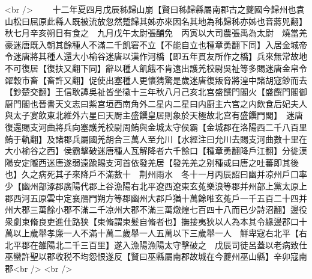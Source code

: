 <br />
　　十二年夏四月戊辰秭歸山崩【賢曰秭歸縣屬南郡古之夔國今歸州也袁山松曰屈原此縣人既被流放忽然蹔歸其姊亦來因名其地為秭歸秭亦姊也音蔣兕翻】　秋七月辛亥朔日有食之　九月戊午太尉張酺免　丙寅以大司農張禹為太尉　燒當羌豪迷唐既入朝其餘種人不滿二千飢窘不立【不能自立也種章勇翻下同】入居金城帝令迷唐將其種人還大小榆谷迷唐以漢作河橋【即五年貫友所作之橋】兵來無常故地不可復居【復扶又翻下同】辭以種人飢餓不肯遠出護羌校尉吳祉等多賜迷唐金帛令糴穀市畜【畜許又翻】促使出塞種人更懷猜驚是歲迷唐復叛脅將湟中諸胡寇鈔而去【鈔楚交翻】王信耿譚吳祉皆坐徵十三年秋八月己亥北宫盛饌門閣火【盛饌門閣御㕑門閣也晉書天文志曰紫宫垣西南角外二星内二星曰内㕑主六宫之内飲食后妃夫人與太子宴飲東北維外六星曰天㕑主盛饌皇居則象於天極故北宫有盛饌門閣】　迷唐復還賜支河曲將兵向塞護羌校尉周鮪與金城太守侯霸【金城郡在洛陽西二千八百里鮪于軌翻】及諸郡兵屬國羌胡合三萬人至允川【水經注曰允川去賜支河曲數十里在大小榆谷之西】侯霸擊破迷唐種人瓦解降者六千餘口【種章勇翻降戶江翻】分徙漢陽安定隴西迷唐遂弱遠踰賜支河首依發羌居【發羌羌之别種或曰唐之吐蕃即其後也】久之病死其子來降戶不滿數十　荆州雨水　冬十一月丙辰詔曰幽并凉州戶口率少【幽州部涿郡廣陽代郡上谷漁陽右北平遼西遼東玄菟樂浪等郡并州部上黨太原上郡西河五原雲中定襄鴈門朔方等郡幽州大郡戶猶十萬餘唯玄菟戶一千五百二十四并州大郡三萬餘小郡不滿二千凉州大郡不滿三萬燉煌七百四十八而已少詩沼翻】邊役衆劇束脩良吏進仕路狭【束脩謂束髪自脩者也】撫接夷狄以人為本其令緣邊郡口十萬以上歲舉孝廉一人不滿十萬二歲舉一人五萬以下三歲舉一人　鮮卑寇右北平【右北平郡在雒陽北二千三百里】遂入漁陽漁陽太守擊破之　戊辰司徒呂蓋以老病致仕　巫蠻許聖以郡收税不均怨恨遂反【賢曰巫縣屬南郡故城在今夔州巫山縣】辛卯寇南郡<br />
<br />
